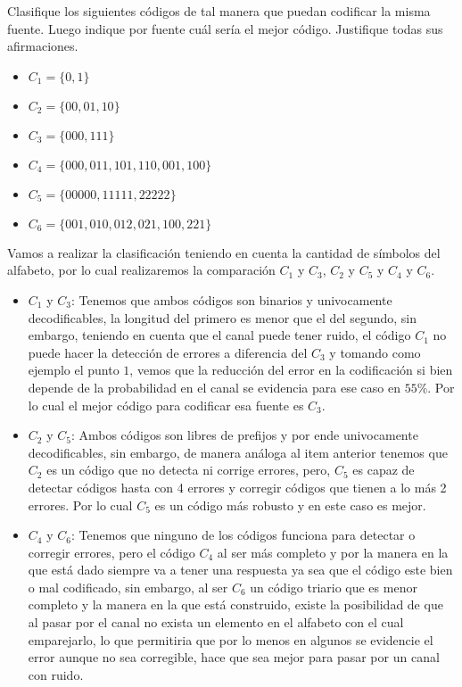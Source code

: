
Clasifique los siguientes códigos de tal manera que puedan codificar la misma fuente. Luego indique por fuente cuál sería el mejor código. Justifique todas sus afirmaciones.
\begin{itemize}
\item $C_1=\{0,1\}$
\item $C_2=\{00,01,10\}$
\item $C_3=\{000,111\}$
\item $C_4=\{000,011,101,110,001,100\}$
\item $C_5=\{00000,11111,22222\}$
\item $C_6=\{001,010,012,021,100,221\}$
\end{itemize}
\begin{sol}
    Vamos a realizar la clasificación teniendo en cuenta la cantidad de símbolos del alfabeto, por lo cual realizaremos la comparación $C_1$ y $C_3$, $C_2$ y $C_5$ y $C_4$ y $C_6$.

\begin{itemize}
\item $C_1$ y $C_3$:
Tenemos que ambos códigos son binarios y univocamente decodificables, la longitud del primero es menor que el del segundo, sin embargo, teniendo en cuenta que el canal puede tener ruido, el código $C_1$ no puede hacer la detección de errores a diferencia del $C_3$ y tomando como ejemplo el punto $1$, vemos que la reducción del error en la codificación si bien depende de la probabilidad en el canal se evidencia para ese caso en $55\%$. Por lo cual el mejor código para codificar esa fuente es $C_3$.
\item $C_2$ y $C_5$:
Ambos códigos son libres de prefijos y por ende univocamente decodificables, sin embargo, de manera análoga al item anterior tenemos que $C_2$ es un código que no detecta ni corrige errores, pero, $C_5$ es capaz de detectar códigos hasta con 4 errores y corregir códigos que tienen a lo más 2 errores. Por lo cual $C_5$ es un código más robusto y en este caso es mejor.
\item $C_4$ y $C_6$:
Tenemos que ninguno de los códigos funciona para detectar o corregir errores, pero el código $C_4$ al ser más completo y por la manera en la que está dado siempre va a tener una respuesta ya sea que el código este bien o mal codificado, sin embargo, al ser $C_6$ un código triario que es menor completo y la manera en la que está construido, existe la posibilidad de que al pasar por el canal no exista un elemento en el alfabeto con el cual emparejarlo, lo que permitiria que por lo menos en algunos se evidencie el error aunque no sea corregible, hace que sea mejor para pasar por un canal con ruido.


\end{itemize}



\end{sol}
